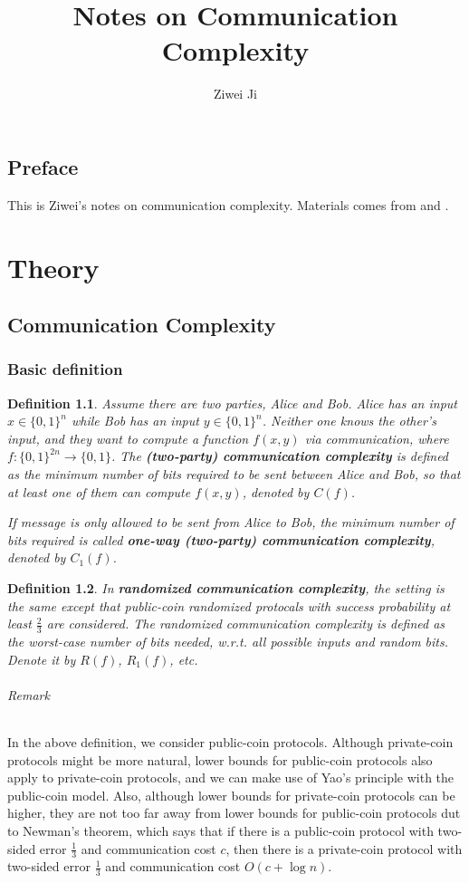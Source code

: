 \documentclass[openany]{book}
\author{Ziwei Ji}
\title{Notes on Communication Complexity}
\newtheorem{definition}{Definition}[chapter]
\begin{document}
\maketitle
\tableofcontents

\chapter*{Preface}
This is Ziwei's notes on communication complexity. Materials comes from \cite{AB09} and \cite{R15}.

\part{Theory}

\chapter{Communication Complexity}
\section{Basic definition}
\begin{definition}
    Assume there are two parties, Alice and Bob. Alice has an input $x\in\{0,1\}^n$ while Bob has an input $y\in\{0,1\}^n$. Neither one knows the other's input, and they want to compute a function $f(x,y)$ via communication, where $f:\{0,1\}^{2n}\to\{0,1\}$. The \textbf{(two-party) communication complexity} is defined as the minimum number of bits required to be sent between Alice and Bob, so that at least one of them can compute $f(x,y)$, denoted by $C(f)$.

    If message is only allowed to be sent from Alice to Bob, the minimum number of bits required is called \textbf{one-way (two-party) communication complexity}, denoted by $C_1(f)$.
\end{definition}

\begin{definition}
    In \textbf{randomized communication complexity}, the setting is the same except that public-coin randomized protocals with success probability at least $\frac{2}{3}$ are considered. The randomized communication complexity is defined as the worst-case number of bits needed, w.r.t. all possible inputs and random bits. Denote it by $R(f)$, $R_1(f)$, etc.
\end{definition}
\paragraph{Remark}
In the above definition, we consider public-coin protocols. Although private-coin protocols might be more natural, lower bounds for public-coin protocols also apply to private-coin protocols, and we can make use of Yao's principle with the public-coin model. Also, although lower bounds for private-coin protocols can be higher, they are not too far away from lower bounds for public-coin protocols dut to Newman's theorem, which says that if there is a public-coin protocol with two-sided error $\frac{1}{3}$ and communication cost $c$, then there is a private-coin protocol with two-sided error $\frac{1}{3}$ and communication cost $O(c+\log n)$.
\end{document}
